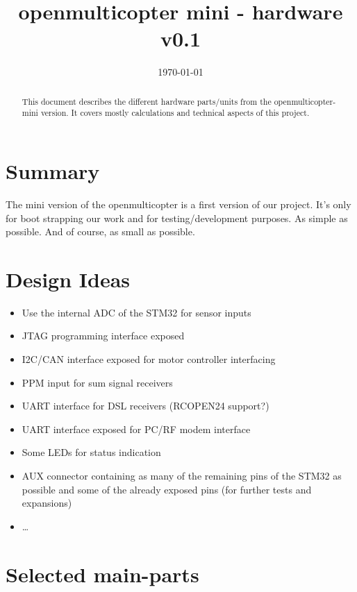 \documentclass[11pt, a4paper]{article}
\title{openmulticopter mini - hardware v0.1}
\author{}
\date{\today}
\begin{document}
\maketitle

\begin{abstract}
This document describes the different hardware parts/units from the openmulticopter-mini version.
It covers mostly calculations and technical aspects of this project.
\end{abstract}

\newpage

\tableofcontents
\newpage

\section{Summary} %
\label{sec:Summary}
The mini version of the openmulticopter is a first version of our project. It’s only for boot strapping 
our work and for testing/development purposes. As simple as possible. And of course, as small as possible.

\section{Design Ideas} %
\label{sec:Design Ideas}
\begin{itemize}
  \item Use the internal ADC of the STM32 for sensor inputs
  \item JTAG programming interface exposed
  \item I2C/CAN interface exposed for motor controller interfacing
  \item PPM input for sum signal receivers
  \item UART interface for DSL receivers (RCOPEN24 support?)
  \item UART interface exposed for PC/RF modem interface
  \item Some LEDs for status indication
  \item AUX connector containing as many of the remaining pins of the STM32 as possible and some of 
    the already exposed pins (for further tests and expansions) 
  \item \dots
\end{itemize}


\section{Selected main-parts} %
\label{sec:Selected Main-Parts}
\end{document}
